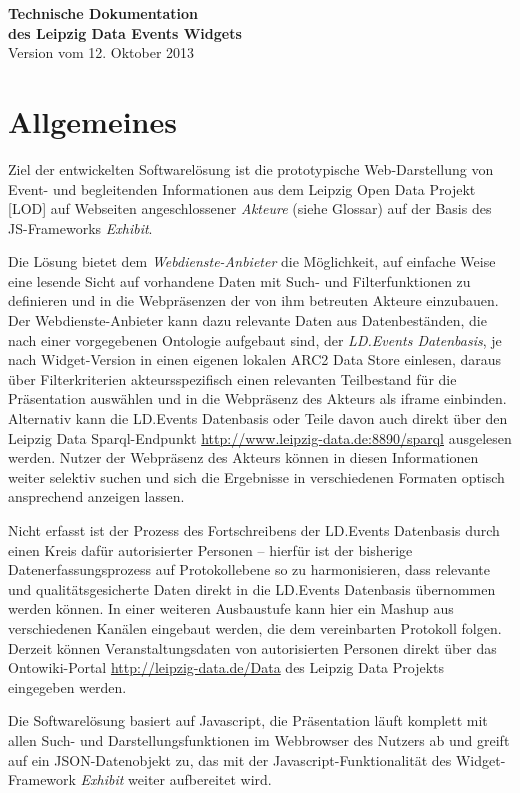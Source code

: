 \documentclass[11pt,a4paper]{article}
\begin{document}
\begin{center}
  \textbf{\Large Technische Dokumentation\\[.3em] des Leipzig Data Events
    Widgets}\\[1em] Version vom 12. Oktober 2013
\end{center}

\section{Allgemeines}
Ziel der entwickelten Softwarelösung ist die prototypische Web-Darstellung von
Event- und begleitenden Informationen aus dem Leipzig Open Data Projekt [LOD]
auf Webseiten angeschlossener \emph{Akteure} (siehe Glossar) auf der Basis des
JS-Frameworks \emph{Exhibit}.

Die Lösung bietet dem \emph{Webdienste-Anbieter} die Möglichkeit, auf einfache
Weise eine lesende Sicht auf vorhandene Daten mit Such- und Filterfunktionen
zu definieren und in die Webpräsenzen der von ihm betreuten Akteure
einzubauen.  Der Webdienste-Anbieter kann dazu relevante Daten aus
Datenbeständen, die nach einer vorgegebenen Ontologie aufgebaut sind, der
\emph{LD.Events Datenbasis}, je nach Widget-Version in einen eigenen lokalen ARC2 Data Store
einlesen, daraus über Filterkriterien akteursspezifisch einen relevanten
Teilbestand für die Präsentation auswählen und in die Webpräsenz des Akteurs
als iframe einbinden. Alternativ kann die LD.Events Datenbasis oder Teile davon auch direkt über den
Leipzig Data Sparql-Endpunkt \url{http://www.leipzig-data.de:8890/sparql}
ausgelesen werden. Nutzer der Webpräsenz des Akteurs können in diesen
Informationen weiter selektiv suchen und sich die Ergebnisse in verschiedenen
Formaten optisch ansprechend anzeigen lassen.



Nicht erfasst ist der Prozess des Fortschreibens der LD.Events Datenbasis
durch einen Kreis dafür autorisierter Personen -- hierfür ist der bisherige
Datenerfassungsprozess auf Protokollebene so zu harmonisieren, dass relevante
und qualitätsgesicherte Daten direkt in die LD.Events Datenbasis übernommen
werden können. In einer weiteren Ausbaustufe kann hier ein Mashup aus
verschiedenen Kanälen eingebaut werden, die dem vereinbarten Protokoll folgen.
Derzeit können Veranstaltungsdaten von autorisierten Personen direkt über das
Ontowiki-Portal \url{http://leipzig-data.de/Data} des Leipzig Data Projekts
eingegeben werden.

Die Softwarelösung basiert auf Javascript, die Präsentation läuft komplett mit
allen Such- und Darstellungsfunktionen im Webbrowser des Nutzers ab und greift
auf ein JSON-Datenobjekt zu, das mit der Javascript-Funktionalität des
Widget-Framework \emph{Exhibit} weiter aufbereitet wird.
\end{document}
